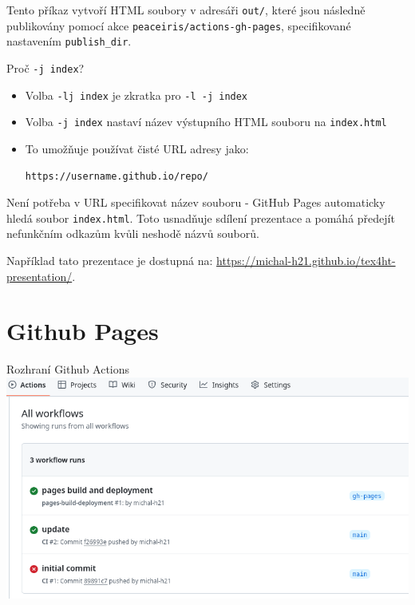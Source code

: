 Tento příkaz vytvoří HTML soubory v adresáři \texttt{out/}, které jsou následně publikovány
pomocí akce \texttt{peaceiris/actions-gh-pages}, specifikované nastavením
\texttt{publish_dir}.

\begin{frame}[fragile]{Proč \texttt{-j index}?}
\begin{itemize}
\item Volba \texttt{-lj index} je zkratka pro \texttt{-l -j index}
\item Volba \texttt{-j index} nastaví název výstupního HTML souboru na \texttt{index.html}
\item To umožňuje používat čisté URL adresy jako:

\begin{verbatim}
https://username.github.io/repo/
\end{verbatim}

\end{itemize}
\end{frame}

Není potřeba v URL specifikovat název souboru - GitHub Pages
automaticky hledá soubor \texttt{index.html}. Toto usnadňuje sdílení
prezentace a pomáhá předejít nefunkčním odkazům kvůli neshodě názvů souborů.

Například tato prezentace je dostupná na: \url{https://michal-h21.github.io/tex4ht-presentation/}.

\section{Github Pages}

\begin{frame}[fragile]{Rozhraní Github Actions}
\includegraphics[width=\textwidth]{img/github-actions.png}
\end{frame}

